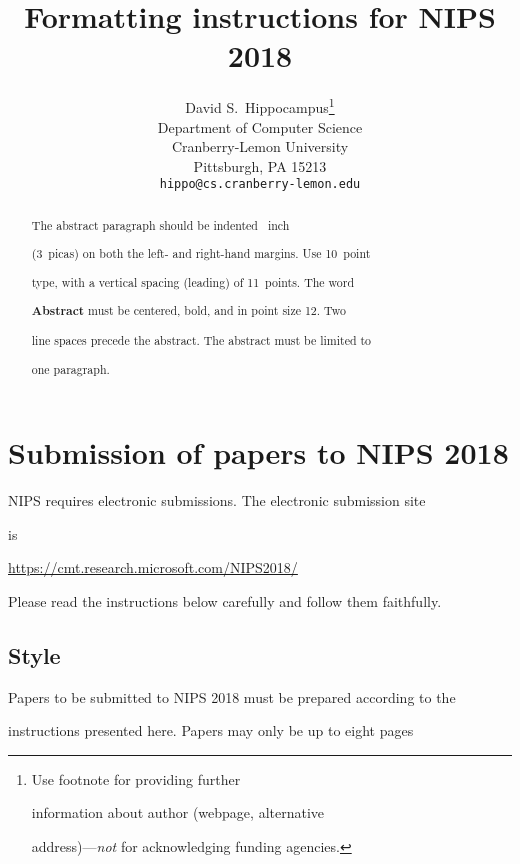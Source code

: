 \documentclass{article}
\title{Formatting instructions for NIPS 2018}
\author{

  David S.~Hippocampus\thanks{Use footnote for providing further

    information about author (webpage, alternative

    address)---\emph{not} for acknowledging funding agencies.} \\

  Department of Computer Science\\

  Cranberry-Lemon University\\

  Pittsburgh, PA 15213 \\

  \texttt{hippo@cs.cranberry-lemon.edu} \\






















}
\begin{document}



\maketitle



\begin{abstract}

  The abstract paragraph should be indented ~inch

  (3~picas) on both the left- and right-hand margins. Use 10~point

  type, with a vertical spacing (leading) of 11~points.  The word

  \textbf{Abstract} must be centered, bold, and in point size 12. Two

  line spaces precede the abstract. The abstract must be limited to

  one paragraph.

\end{abstract}



\section{Submission of papers to NIPS 2018}



NIPS requires electronic submissions.  The electronic submission site

is

\begin{center}

  \url{https://cmt.research.microsoft.com/NIPS2018/}

\end{center}



Please read the instructions below carefully and follow them faithfully.



\subsection{Style}



Papers to be submitted to NIPS 2018 must be prepared according to the

instructions presented here. Papers may only be up to eight pages
\end{document}
